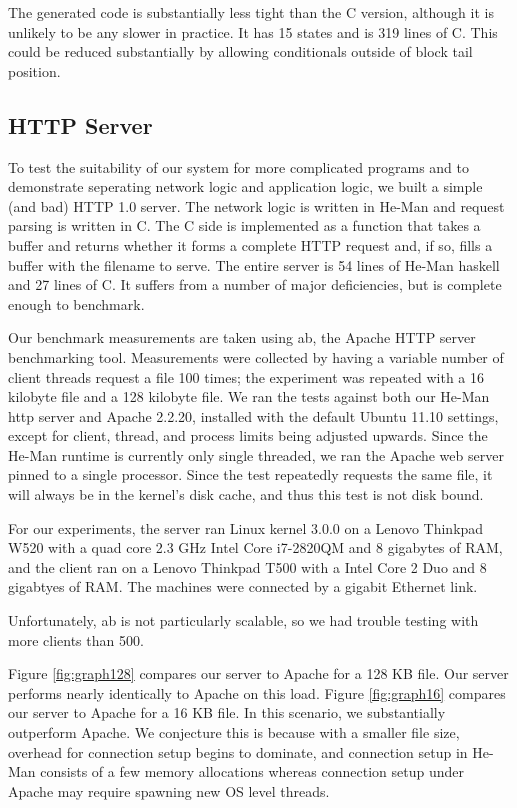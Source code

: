 \documentclass[preprint,11pt]{sigplanconf}
\begin{document}
The generated code is substantially less tight than the C version,
although it is unlikely to be any slower in practice. It has 15 states
and is 319 lines of C. This could be reduced substantially by allowing
conditionals outside of block tail position.

\subsection{HTTP Server}

To test the suitability of our system for more complicated programs
and to demonstrate seperating network logic and application logic, we
built a simple (and bad) HTTP 1.0 server. The network logic is written
in He-Man and request parsing is written in C. The C side is
implemented as a function that takes a buffer and returns whether it
forms a complete HTTP request and, if so, fills a buffer with the
filename to serve. The entire server is 54 lines of He-Man haskell and
27 lines of C. It suffers from a number of major deficiencies, but is
complete enough to benchmark.

Our benchmark measurements are taken using ab, the Apache HTTP server
benchmarking tool. \cite{ApacheAB} Measurements were collected by
having a variable number of client threads request a file 100 times;
the experiment was repeated with a 16 kilobyte file and a 128 kilobyte
file. We ran the tests against both our He-Man http server and Apache
2.2.20, installed with the default Ubuntu 11.10 settings, except for
client, thread, and process limits being adjusted upwards. Since the
He-Man runtime is currently only single threaded, we ran the Apache
web server pinned to a single processor. Since the test repeatedly
requests the same file, it will always be in the kernel's disk cache,
and thus this test is not disk bound.

For our experiments, the server ran Linux kernel 3.0.0 on a Lenovo
Thinkpad W520 with a quad core 2.3 GHz Intel Core i7-2820QM and 8
gigabytes of RAM, and the client ran on a Lenovo Thinkpad T500 with a
Intel Core 2 Duo and 8 gigabtyes of RAM.  %
The machines were connected by a gigabit Ethernet link.

Unfortunately, ab is not particularly scalable, so we had trouble
testing with more clients than 500.

Figure \ref{fig:graph128} compares our server to Apache for a 128 KB
file. Our server performs nearly identically to Apache on this load.
Figure \ref{fig:graph16} compares our server to Apache for a 16 KB
file. In this scenario, we substantially outperform Apache. We
conjecture this is because with a smaller file size, overhead for
connection setup begins to dominate, and connection setup in He-Man
consists of a few memory allocations whereas connection setup under
Apache may require spawning new OS level threads.
\end{document}
